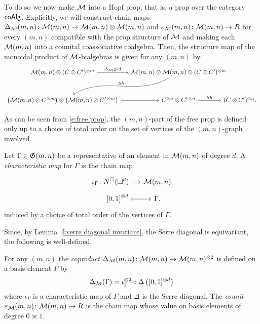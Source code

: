 To do so we now make $\mathcal{M}$ into a Hopf prop, that is, a prop over the category $\mathsf{coAlg}$.
Explicitly, we will construct chain maps $\Delta_{\mathcal{M}}(m,n) \colon \mathcal{M}(m,n) \to \mathcal{M}(m,n) \otimes \mathcal{M}(m,n)$ and $\varepsilon_{\mathcal{M}}(m,n) \colon \mathcal{M}(m,n) \to R$ for every $(m,n)$ compatible with the prop structure of $\mathcal{M}$ and making each $\mathcal{M}(m,n)$ into a counital coassociative coalgebra.
Then, the structure map of the monoidal product of $\mathcal{M}$-bialgebras is given for any $(m,n)$ by 
\begin{equation*}
\begin{tikzcd} [column sep = small, row sep=large]
\M(m,n) \otimes (C \otimes C^\prime)^{\otimes m} \arrow[r, "\Delta_\M \otimes \id"] & \M(m,n) \otimes \M(m,n) \otimes (C \otimes C^\prime)^{\otimes m} \arrow[dl, out=-150, in=30, "Sh"'] &[-25pt] \\
\big(\M(m,n) \otimes C^{\otimes m}\big) \otimes \big(\M(m,n) \otimes C^{\prime\, \otimes m}\big) \arrow[r] & 
C^{\otimes n} \otimes C^{\prime\, \otimes n} \arrow[r, "Sh"] &[-25pt]
(C \otimes C^\prime)^{\otimes n}.
\end{tikzcd}
\end{equation*}

As can be seen from \eqref{e:free prop}, the $(m,n)$-part of the free prop is defined only up to a choice of total order on the set of vertices of the $(m,n)$-graph involved.

\begin{definition}
	Let $\Gamma \in \mathfrak{G}(m,n)$ be a representative of an element in $\mathcal{M}(m,n)$ of degree $d$. A \textit{characteristic map} for $\Gamma$ is the chain map \vspace*{-5pt}
	\begin{equation} \label{e:order chain map}
	\begin{tikzcd}[row sep=tiny, column sep=small]
	\iota_\Gamma \colon \cchains(\square^d) \arrow[r] & \M(m,n) \\
	\qquad {[0,1]}^{\otimes d} \arrow[r, |->] & \Gamma.
	\end{tikzcd}
	\end{equation}
	induced by a choice of total order of the vertices of $\Gamma$.
\end{definition}

Since, by Lemma~\ref{l:serre diagonal invariant}, the Serre diagonal is equivariant, the following is well-defined.
\begin{definition}
	For any $(m,n)$ the \textit{coproduct} $\Delta_{\mathcal{M}}(m,n) \colon \mathcal{M}(m,n) \to \mathcal{M}(m,n)^{\otimes 2}$ is defined on a basis element $\Gamma$ by
	\begin{equation} \label{e:diagonal of M}
	\Delta_{\mathcal{M}}(\Gamma) = \iota_\Gamma^{\otimes 2} \circ \Delta \left([0,1]^{\otimes d}\right)
	\end{equation}
	where $\iota_\Gamma$ is a characteristic map of $\Gamma$ and $\Delta$ is the Serre diagonal.
	The \textit{counit} $\varepsilon_{\mathcal{M}}(m,n) \colon \mathcal{M}(m,n) \to R$ is the chain map whose value on basis elements of degree $0$ is $1$. 
\end{definition}

